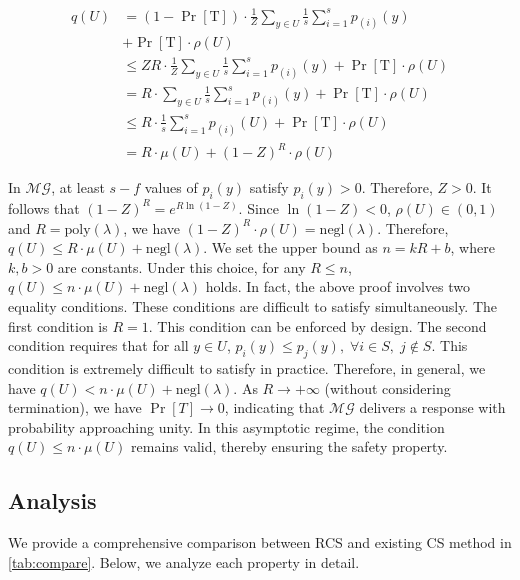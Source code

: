 \documentclass[11pt]{article}
\begin{document}
\begin{align*}
q(U) &= (1-\Pr[\text{T}]) \cdot \frac{1}{Z} \sum_{y \in U}\frac{1}{s}\sum_{i=1}^{s}p_{(i)}(y) \\ &+ \Pr[\text{T}] \cdot \rho(U)\\
&\leq  ZR \cdot \frac{1}{Z} \sum_{y \in U}\frac{1}{s}\sum_{i=1}^{s}p_{(i)}(y) + \Pr[\text{T}] \cdot \rho(U)\\
&=  R \cdot \sum_{y \in U}\frac{1}{s}\sum_{i=1}^{s}p_{(i)}(y) + \Pr[\text{T}] \cdot \rho(U)\\
&\leq R \cdot \frac{1}{s}\sum_{i=1}^{s}p_{(i)}(U) + \Pr[\text{T}] \cdot \rho(U) \\
&= R \cdot\mu(U) + (1-Z)^R \cdot \rho(U)
\end{align*}

In $\mathcal{MG}$, at least $s - f$ values of $p_i(y)$ satisfy $p_i(y) > 0$. Therefore, $Z > 0$. It follows that
$(1-Z)^R = e^{R \ln(1-Z)}$. Since $\ln(1-Z) < 0$, $\rho(U) \in (0,1)$ and $R = \mathrm{poly}(\lambda)$, we have $(1-Z)^R \cdot \rho(U) = \mathrm{negl}(\lambda)$. Therefore, $q(U) \leq R \cdot \mu(U) + \text{negl}(\lambda)$. We set the upper bound as $n = k R + b$, where $k,b > 0$ are constants. Under this choice, for any $R \le n$, $q(U) \le n \cdot \mu(U) + \mathrm{negl}(\lambda)$ holds. In fact, the above proof involves two equality conditions. These conditions are difficult to satisfy simultaneously. The first condition is $R = 1$. This condition can be enforced by design. The second condition requires that for all $y \in U$,
$p_i(y) \le p_j(y), \; \forall i \in S,\; j \notin S .$
This condition is extremely difficult to satisfy in practice. Therefore, in general, we have $q(U) < n \cdot \mu(U) + \mathrm{negl}(\lambda)$. As $R \to +\infty$ (without considering termination), we have $\Pr[T] \to 0$, indicating that $\mathcal{MG}$ delivers a response with probability approaching unity. In this asymptotic regime, the condition $q(U) \le n \cdot \mu(U)$ remains valid, thereby ensuring the safety property.





\subsection{Analysis}
We provide a comprehensive comparison between RCS and existing CS method in \autoref{tab:compare}. Below, we analyze each property in detail.
\end{document}
